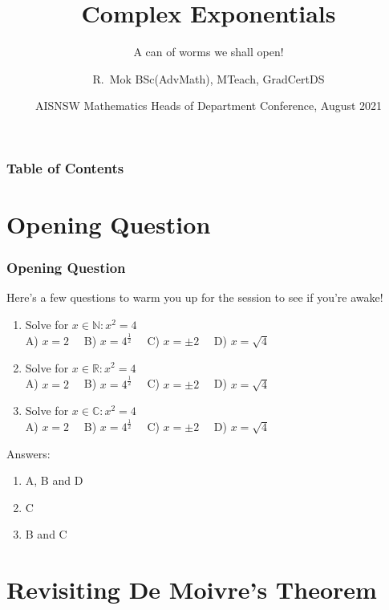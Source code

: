 \documentclass{beamer}
\title[Complex Exponentials] %
{Complex Exponentials}
\subtitle{A can of worms we shall open!}
\author[R. Mok] %
{R.~Mok BSc(AdvMath), MTeach, GradCertDS}
\date[August 2021] %
{AISNSW Mathematics Heads of Department Conference, August 2021}
\begin{document}
\frame{\titlepage}


\begin{frame}
\frametitle{Table of Contents}
\tableofcontents
\end{frame}


\section{Opening Question}

\begin{frame}
\frametitle{Opening Question}
Here's a few questions to warm you up for the session to see if you're awake!

\begin{enumerate}
  \item Solve for $x \in \mathbb{N}: x^2 = 4$\\
    A) $x = 2\quad$ B) $x = 4^{\frac{1}{2}}\quad$ C) $x = \pm 2\quad$ D) $x= \sqrt{4}$
  \item Solve for $x \in \mathbb{R}: x^2 = 4$\\
    A) $x = 2\quad$ B) $x = 4^{\frac{1}{2}}\quad$ C) $x = \pm 2\quad$ D) $x= \sqrt{4}$
  \item Solve for $x \in \mathbb{C}: x^2 = 4$\\
    A) $x = 2\quad$ B) $x = 4^{\frac{1}{2}}\quad$ C) $x = \pm 2\quad$ D) $x= \sqrt{4}$
\end{enumerate}
\pause
Answers:
\begin{enumerate}
  \item A, B and D
  \item C
  \item \alert{B and C}
\end{enumerate}
\end{frame}


\section{Revisiting De Moivre's Theorem}
\end{document}
